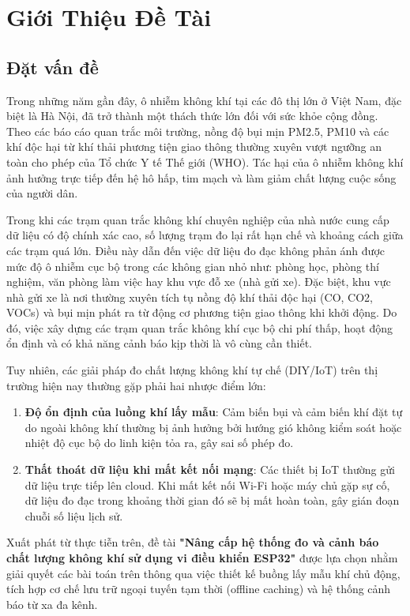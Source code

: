 \chapter{Giới Thiệu Đề Tài}

\section{Đặt vấn đề}
Trong những năm gần đây, ô nhiễm không khí tại các đô thị lớn ở Việt Nam, đặc biệt là Hà Nội, đã trở thành một thách thức lớn đối với sức khỏe cộng đồng. Theo các báo cáo quan trắc môi trường, nồng độ bụi mịn PM2.5, PM10 và các khí độc hại từ khí thải phương tiện giao thông thường xuyên vượt ngưỡng an toàn cho phép của Tổ chức Y tế Thế giới (WHO). Tác hại của ô nhiễm không khí ảnh hưởng trực tiếp đến hệ hô hấp, tim mạch và làm giảm chất lượng cuộc sống của người dân.

Trong khi các trạm quan trắc không khí chuyên nghiệp của nhà nước cung cấp dữ liệu có độ chính xác cao, số lượng trạm đo lại rất hạn chế và khoảng cách giữa các trạm quá lớn. Điều này dẫn đến việc dữ liệu đo đạc không phản ánh được mức độ ô nhiễm cục bộ trong các không gian nhỏ như: phòng học, phòng thí nghiệm, văn phòng làm việc hay khu vực đỗ xe (nhà gửi xe). Đặc biệt, khu vực nhà gửi xe là nơi thường xuyên tích tụ nồng độ khí thải độc hại (CO, CO2, VOCs) và bụi mịn phát ra từ động cơ phương tiện giao thông khi khởi động. Do đó, việc xây dựng các trạm quan trắc không khí cục bộ chi phí thấp, hoạt động ổn định và có khả năng cảnh báo kịp thời là vô cùng cần thiết.

Tuy nhiên, các giải pháp đo chất lượng không khí tự chế (DIY/IoT) trên thị trường hiện nay thường gặp phải hai nhược điểm lớn:
\begin{enumerate}
    \item \textbf{Độ ổn định của luồng khí lấy mẫu}: Cảm biến bụi và cảm biến khí đặt tự do ngoài không khí thường bị ảnh hưởng bởi hướng gió không kiểm soát hoặc nhiệt độ cục bộ do linh kiện tỏa ra, gây sai số phép đo.
    \item \textbf{Thất thoát dữ liệu khi mất kết nối mạng}: Các thiết bị IoT thường gửi dữ liệu trực tiếp lên cloud. Khi mất kết nối Wi-Fi hoặc máy chủ gặp sự cố, dữ liệu đo đạc trong khoảng thời gian đó sẽ bị mất hoàn toàn, gây gián đoạn chuỗi số liệu lịch sử.
\end{enumerate}

Xuất phát từ thực tiễn trên, đề tài \textbf{"Nâng cấp hệ thống đo và cảnh báo chất lượng không khí sử dụng vi điều khiển ESP32"} được lựa chọn nhằm giải quyết các bài toán trên thông qua việc thiết kế buồng lấy mẫu khí chủ động, tích hợp cơ chế lưu trữ ngoại tuyến tạm thời (offline caching) và hệ thống cảnh báo từ xa đa kênh.

